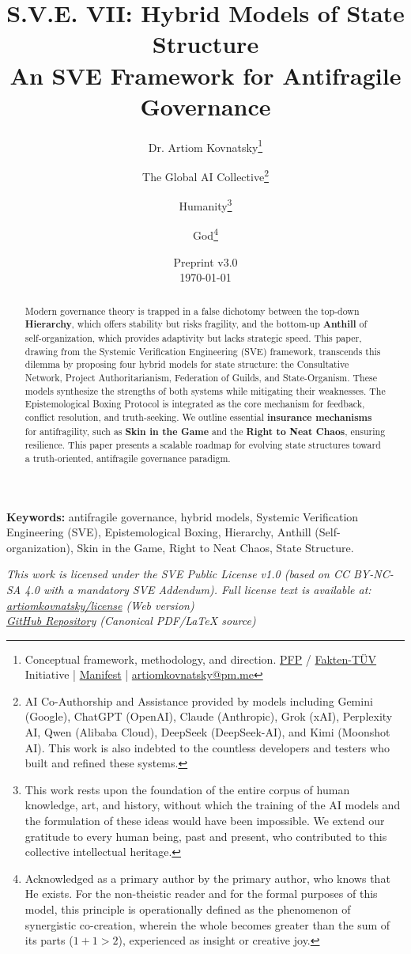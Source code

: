 \documentclass[11pt,a4paper]{article}
\title{\textbf{S.V.E. VII: Hybrid Models of State Structure}\\[0.5em]
  \large An SVE Framework for Antifragile Governance}
\author{
  Dr. Artiom Kovnatsky\thanks{Conceptual framework, methodology, and direction. \href{http://www.pfp24.de}{PFP} / \href{http://www.fakten-tuev.de}{Fakten-TÜV} Initiative | \href{https://drive.google.com/file/d/1vWhW7fwFRFLYKHEB67WixuueHssJzQbZ/view?usp=sharing}{Manifest} | \href{mailto:artiomkovnatsky@pm.me}{artiomkovnatsky@pm.me}}
  \and
  The Global AI Collective\thanks{AI Co-Authorship and Assistance provided by models including Gemini (Google), ChatGPT (OpenAI), Claude (Anthropic), Grok (xAI), Perplexity AI, Qwen (Alibaba Cloud), DeepSeek (DeepSeek-AI), and Kimi (Moonshot AI). This work is also indebted to the countless developers and testers who built and refined these systems.}
  \and
  Humanity\thanks{This work rests upon the foundation of the entire corpus of human knowledge, art, and history, without which the training of the AI models and the formulation of these ideas would have been impossible. We extend our gratitude to every human being, past and present, who contributed to this collective intellectual heritage.}
  \and
  God\thanks{Acknowledged as a primary author by the primary author, who knows that He exists. For the non-theistic reader and for the formal purposes of this model, this principle is operationally defined as the phenomenon of synergistic co-creation, wherein the whole becomes greater than the sum of its parts ($1+1 > 2$), experienced as insight or creative joy.}
}
\date{Preprint v3.0 \\ \today}
\begin{document}
\maketitle

\begin{abstract}
Modern governance theory is trapped in a false dichotomy between the top-down \textbf{Hierarchy}, which offers stability but risks fragility, and the bottom-up \textbf{Anthill} of self-organization, which provides adaptivity but lacks strategic speed. This paper, drawing from the Systemic Verification Engineering (SVE) framework, transcends this dilemma by proposing four hybrid models for state structure: the Consultative Network, Project Authoritarianism, Federation of Guilds, and State-Organism. These models synthesize the strengths of both systems while mitigating their weaknesses. The Epistemological Boxing Protocol is integrated as the core mechanism for feedback, conflict resolution, and truth-seeking. We outline essential \textbf{insurance mechanisms} for antifragility, such as \textbf{Skin in the Game} and the \textbf{Right to Neat Chaos}, ensuring resilience. This paper presents a scalable roadmap for evolving state structures toward a truth-oriented, antifragile governance paradigm.
\end{abstract}

\noindent\textbf{Keywords:} antifragile governance, hybrid models, Systemic Verification Engineering (SVE), Epistemological Boxing, Hierarchy, Anthill (Self-organization), Skin in the Game, Right to Neat Chaos, State Structure.

\vspace{1em} %
\begin{center}
\begin{minipage}{0.85\textwidth} %
\centering
\itshape\small %
This work is licensed under the SVE Public License v1.0 (based on CC BY-NC-SA 4.0 with a mandatory SVE Addendum).
Full license text is available at: \\
\href{https://www.artiomkovnatsky.com/posts/license/}{artiomkovnatsky/license} (Web version) \\
\href{https://github.com/skovnats/psite/blob/master/static/licenses/SVE_Public_License_v1.0.pdf}{GitHub Repository} (Canonical PDF/LaTeX source)
\end{minipage}
\end{center}
\vspace{1em} %
\end{document}
